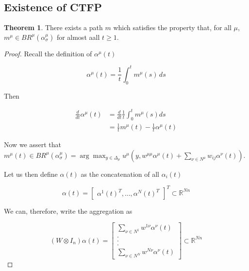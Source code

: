 \documentclass{article}
\theoremstyle{definition}
\newtheorem{theorem}{Theorem}
\begin{document}
	\subsection{Existence of CTFP}

	\begin{theorem}
		There exists a path $m$ which satisfies the property that, for all $\mu$, $m^\mu \in
		BR^\mu(\alpha_\sigma^\mu)$ for almost aall $t \geq 1$.
	\end{theorem}

	\begin{proof}
		Recall the definition of $\alpha^\mu(t)$

		\begin{equation*}
		\alpha^\mu(t) = \frac{1}{t} \int_{0}^{t} m^\mu(s) \, ds
		\end{equation*}

		Then 

		\begin{align}
		\frac{d}{dt} \alpha^\mu(t) & = \frac{d}{dt} \frac{1}{t} \int_{0}^t m^\mu(s) ds \nonumber \\
		& = \frac{1}{t} m^\mu(t) - \frac{1}{t} \alpha^\mu(t)
		\end{align}

		Now we assert that $m^\mu(t) \in BR^\mu(\alpha_{\sigma}^\mu) = \arg\max_{y \in \Delta_\mu} u^\mu(y,
		w^{\mu \mu} \alpha^\mu(t) + \sum_{\nu \in N^\mu} w_{ij} \alpha^\nu(t))$. 

		Let us then define $\alpha(t)$ as the concatenation of all $\alpha_i(t)$

		\begin{equation}
			\alpha(t) = \begin{bmatrix}
				\alpha^1(t)^T, \ldots, \alpha^N(t)^T
			\end{bmatrix}^T \subset \mathbb{R}^{Nn}
		\end{equation}


		We can, therefore, write the aggregation as

		\begin{equation}
			(W \otimes I_n) \alpha(t) = \begin{bmatrix}
				\sum_{\nu \in N^1} w^{1 \nu} \alpha^\nu(t) \\
				.\\
				.\\
				.\\
				\sum_{\nu \in N^N} w^{N \nu} \alpha^\nu(t)
			\end{bmatrix} \subset \mathbb{R}^{Nn}
		\end{equation}


\end{proof}
\end{document}
